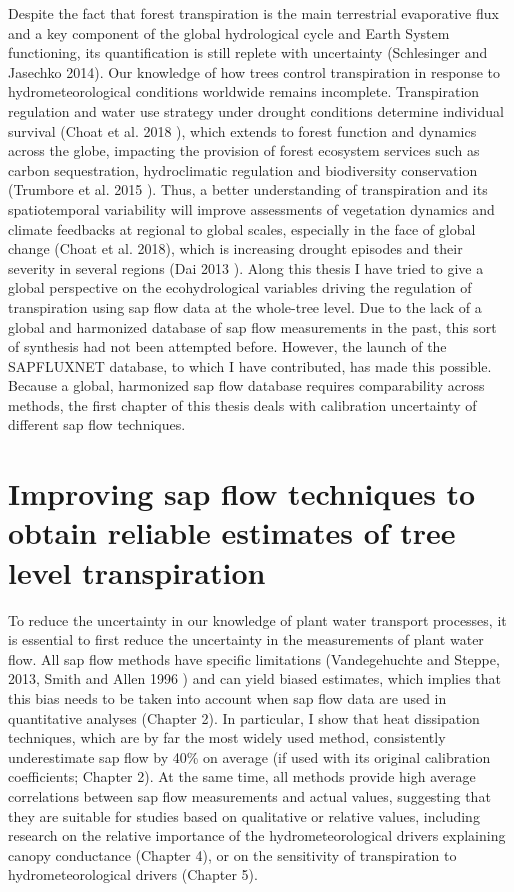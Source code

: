 \documentclass[11pt,twoside]{reedthesis}
\begin{document}
\setlength{\parindent}{0pt} Despite the fact that forest transpiration
is the main terrestrial evaporative flux and a key component of the
global hydrological cycle and Earth System functioning, its
quantification is still replete with uncertainty (Schlesinger and
Jasechko 2014). Our knowledge of how trees control transpiration in
response to hydrometeorological conditions worldwide remains incomplete.
Transpiration regulation and water use strategy under drought conditions
determine individual survival (Choat et al. 2018 ), which extends to
forest function and dynamics across the globe, impacting the provision
of forest ecosystem services such as carbon sequestration, hydroclimatic
regulation and biodiversity conservation (Trumbore et al. 2015 ). Thus,
a better understanding of transpiration and its spatiotemporal
variability will improve assessments of vegetation dynamics and climate
feedbacks at regional to global scales, especially in the face of global
change (Choat et al. 2018), which is increasing drought episodes and
their severity in several regions (Dai 2013 ). Along this thesis I have
tried to give a global perspective on the ecohydrological variables
driving the regulation of transpiration using sap flow data at the
whole-tree level. Due to the lack of a global and harmonized database of
sap flow measurements in the past, this sort of synthesis had not been
attempted before. However, the launch of the SAPFLUXNET database, to
which I have contributed, has made this possible. Because a global,
harmonized sap flow database requires comparability across methods, the
first chapter of this thesis deals with calibration uncertainty of
different sap flow techniques. \par

\section{Improving sap flow techniques to obtain reliable estimates of
tree level
transpiration}\label{improving-sap-flow-techniques-to-obtain-reliable-estimates-of-tree-level-transpiration}

To reduce the uncertainty in our knowledge of plant water transport
processes, it is essential to first reduce the uncertainty in the
measurements of plant water flow. All sap flow methods have specific
limitations (Vandegehuchte and Steppe, 2013, Smith and Allen 1996 ) and
can yield biased estimates, which implies that this bias needs to be
taken into account when sap flow data are used in quantitative analyses
(Chapter 2). In particular, I show that heat dissipation techniques,
which are by far the most widely used method, consistently underestimate
sap flow by 40\% on average (if used with its original calibration
coefficients; Chapter 2). At the same time, all methods provide high
average correlations between sap flow measurements and actual values,
suggesting that they are suitable for studies based on qualitative or
relative values, including research on the relative importance of the
hydrometeorological drivers explaining canopy conductance (Chapter 4),
or on the sensitivity of transpiration to hydrometeorological drivers
(Chapter 5). \par
\end{document}
